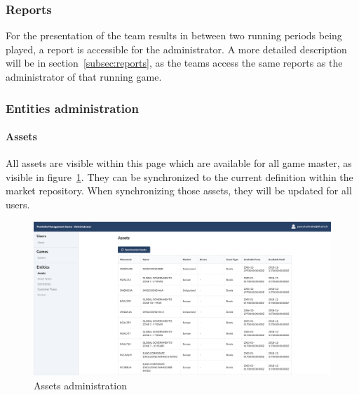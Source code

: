 \subsubsection{Reports}
For the presentation of the team results in between two running periods being played, a report is accessible for the administrator. A more detailed description will be in section~\ref{subsec:reports}, as the teams access the same reports as the administrator of that running game.


\subsubsection{Entities administration}

\paragraph{Assets}
All assets are visible within this page which are available for all game master, as visible in figure~\ref{fig:assets}. They can be synchronized to the current definition within the market repository. When synchronizing those assets, they will be updated for all users. %
\begin{figure}[h!]
  \centering
  \includegraphics[scale=0.2]{img/application-overview/administrator/entities_assets.png}
  \caption{Assets administration}
  \label{fig:assets}
\end{figure}


